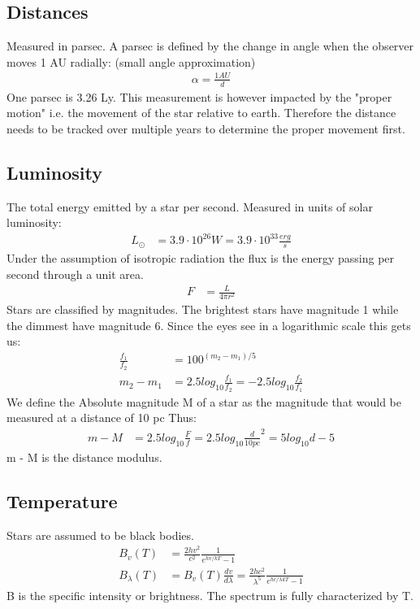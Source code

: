 \documentclass[11pt,a4paper]{article}
\begin{document}
\subsection{Distances}
Measured in parsec.
A parsec is defined by the change in angle when the observer moves 1 AU radially: (small angle approximation)
\begin{align*}
    \alpha = \frac {1 AU} d
\end{align*}
One parsec is 3.26 Ly.
This measurement is however impacted by the "proper motion" i.e. the movement of the star relative to earth. 
Therefore the distance needs to be tracked over multiple years to determine the proper movement first.
\subsection{Luminosity} \label{Distance Modulus}
The total energy emitted by a star per second.
Measured in units of solar luminosity: 
\begin{align*}
    L_\odot  &= 3.9 \cdot 10^{26} W = 3.9 \cdot 10^{33} \frac {erg} s 
\end{align*}
Under the assumption of isotropic radiation the flux is the energy passing per second through a unit area.
\begin{align*}
    F &= \frac {L}{4 \pi r^2} 
\end{align*}
Stars are classified by magnitudes. 
The brightest stars have magnitude 1 while the dimmest have magnitude 6. 
Since the eyes see in a logarithmic scale this gets us: 
\begin{align*}
    \frac {f_1}{ f_2} &= 100^{(m_2-m_1)/5}  \\ 
    m_2 - m_1 &= 2.5 log_{10} \frac {f_1}{f_2} = -2.5 log_{10} \frac {f_2}{f_1}
\end{align*}
We define the Absolute magnitude M of a star as the magnitude that would be measured at a distance of 10 pc
Thus: 
\begin{align*}
    m-M &= 2.5 log_{10} \frac F f = 2.5 log_{10} \frac {d}{10pc}^2 = 5 log_{10} d -5
\end{align*}
m - M is the distance modulus.
\subsection{Temperature}
Stars are assumed to be black bodies. 
\begin{align*}
B_v(T) &= \frac{2hv^2}{c^2}\frac{1}{e^{hv/kT}-1} \\
B_\lambda (T) &= B_v(T) \frac {dv}{d\lambda} = \frac{2hc^2}{\lambda^5}\frac{1}{e^{hc/\lambda kT}-1} 
\end{align*}
B is the specific intensity or brightness. 
The spectrum is fully characterized by T.
\end{document}
